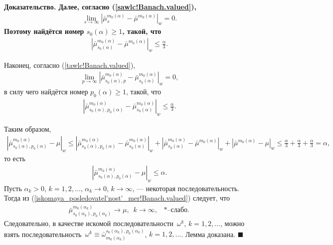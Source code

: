 \documentclass{report}
\newenvironment{Proof}{\par\noindent\bf Доказательство.\rm}{ $\blacksquare$\par}
\begin{document}
\begin{Proof}
Далее, согласно (\ref{sawlc!Banach.valued}),
\begin{gather*}
\lim\limits_{s\to\infty}|\bar{\mu}^{m_0(\alpha)}_s-\bar\mu^{m_0(\alpha)}|_w=0.
\end{gather*}
Поэтому найдётся номер $s_0(\alpha)\geqslant1$, такой, что
\begin{gather*}
|\bar{\mu}^{m_0(\alpha)}_{s_0(\alpha)}-\bar\mu^{m_0(\alpha)}|_w\leqslant\frac\alpha3.
\end{gather*}

Наконец, согласно (\ref{tawlc!Banach.valued}),
\begin{gather*}
\lim\limits_{p\to\infty}|\bar{\mu}^{m_0(\alpha)}_{s_0(\alpha),p}-\bar\mu^{m_0(\alpha)}_{s_0(\alpha)}|_w=0,
\end{gather*}
в силу чего найдётся номер $p_0(\alpha)\geqslant1$, такой, что
\begin{gather*}
|\bar{\mu}^{m_0(\alpha)}_{s_0(\alpha),p_0(\alpha)}-\bar\mu^{m_0(\alpha)}_{s_0(\alpha)}|_w\leqslant\frac\alpha3.
\end{gather*}

Таким образом,
\begin{gather*}
|\bar{\mu}^{m_0(\alpha)}_{s_0(\alpha),p_0(\alpha)}-\mu|_w\leqslant |\bar{\mu}^{m_0(\alpha)}_{s_0(\alpha),p_0(\alpha)}-\bar\mu^{m_0(\alpha)}_{s_0(\alpha)}|_w+
|\bar{\mu}^{m_0(\alpha)}_{s_0(\alpha)}-\bar\mu^{m_0(\alpha)}|_w+|\bar{\mu}^{m_0(\alpha)}-\mu|_w\leqslant \frac\alpha3+\frac\alpha3+\frac\alpha3=\alpha,
\end{gather*}
то есть
\begin{gather}\label{iskomaya_posledovatel'nost'_mer!Banach.valued}
|\bar{\mu}^{m_0(\alpha)}_{s_0(\alpha),p_0(\alpha)}-\mu|_w\leqslant\alpha.
\end{gather}
Пусть $\alpha_k>0$, $k=1,2,\dots$, $\alpha_k\to0$, $k\to\infty$, --- некоторая последовательность. Тогда из (\ref{iskomaya_posledovatel'nost'_mer!Banach.valued}) следует, что
\begin{gather*}
\bar{\mu}^{m_0(\alpha_k)}_{s_0(\alpha_k),p_0(\alpha_k)}\to\mu,\,\,\,k\to\infty,\text{ $*$--слабо.}
\end{gather*}
Следовательно, в качестве искомой последовательности~$\omega^k$, $k=1,2,\dots$, можно взять последовательность~$\omega^k\equiv\bar\omega_{m_0(\alpha_k)}^{s_0(\alpha_k),p_0(\alpha_k)}$,
$k=1,2,\dots$. Лемма доказана.
\end{Proof}
\end{document}
